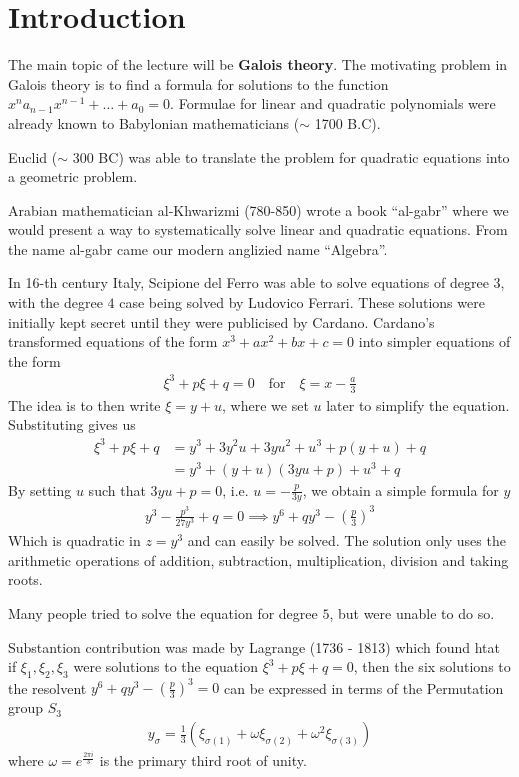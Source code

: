 \section{Introduction}
The main topic of the lecture will be \textbf{Galois theory}.
The motivating problem in Galois theory is to find a formula for solutions to the function $x^{n} a_{n-1}x^{n-1} + \ldots + a_0 = 0$.
Formulae for linear and quadratic polynomials were already known to Babylonian mathematicians ($\sim$ 1700 B.C).

Euclid ($\sim$ 300 BC) was able to translate the problem for quadratic equations into a geometric problem.

Arabian mathematician al-Khwarizmi (780-850) wrote a book ``al-gabr'' where we would present a way to systematically solve linear and quadratic equations. From the name al-gabr came our modern anglizied name ``Algebra''.

In 16-th century Italy, Scipione del Ferro was able to solve equations of degree $3$, with the degree $4$ case being solved by Ludovico Ferrari.
These solutions were initially kept secret until they were publicised by Cardano.
Cardano's transformed equations of the form $x^{3} + ax^{2} + bx + c =0$ into simpler equations of the form
\begin{align*}
  \xi^{3} + p \xi + q = 0 \quad \text{for} \quad \xi = x - \frac{a}{3}
\end{align*}
The idea is to then write $\xi = y + u$, where we set $u$ later to simplify the equation. Substituting gives us
\begin{align*}
  \xi^{3} + p \xi + q &= y^{3} + 3y^{2}u + 3yu^{2} + u^{3} + p(y+u) + q\\
                      &= y^{3} + (y+u)(3yu + p) + u^{3} + q
\end{align*}
By setting $u$ such that $3yu + p = 0$, i.e. $u = -\frac{p}{3y}$, we obtain a simple formula for $y$
\begin{align*}
  y^{3} - \frac{p^{3}}{27y^{3}} + q = 0 \implies y^{6} + qy^{3} - \left(\frac{p}{3}\right)^3
\end{align*}
Which is quadratic in $z = y^{3}$ and can easily be solved. The solution only uses the arithmetic operations of addition, subtraction, multiplication, division and taking roots.


Many people tried to solve the equation for degree $5$, but were unable to do so.

Substantion contribution was made by Lagrange (1736 - 1813) which found htat if $\xi_1, \xi_2, \xi_3$ were solutions to the equation $\xi^{3} + p \xi + q = 0$, then the six solutions to the resolvent $y^{6} + qy^{3} - \left(
  \frac{p}{3}
\right)^{3} = 0$
can be expressed in terms of the Permutation group $S_3$
\begin{align*}
  y_{\sigma} = \frac{1}{3} \left(
    \xi_{\sigma(1)} + \omega \xi_{\sigma(2)}+ \omega^{2} \xi_{\sigma(3)}
  \right)
\end{align*}
where $\omega = e^{\frac{2 \pi i}{3}}$ is the primary third root of unity.

